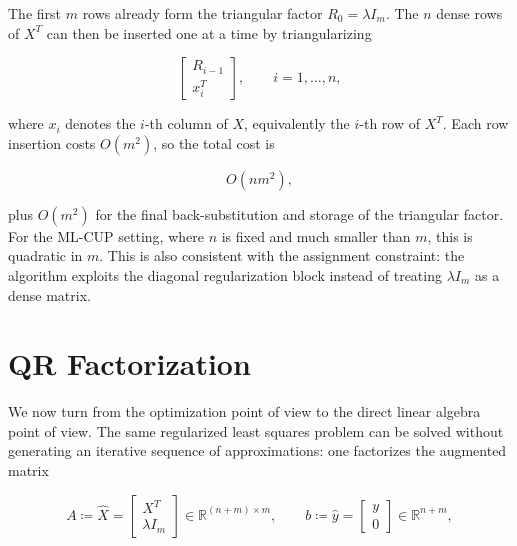 \documentclass[11pt,a4paper]{article}
\newcommand{\R}{\mathbb{R}}
\newcommand{\Xhat}{\hat{X}}
\newcommand{\yhat}{\hat{y}}
\begin{document}
The first $m$ rows already form the triangular factor $R_0=\lambda I_m$. The $n$ dense 
rows of $X^T$ can then be inserted one at a time by triangularizing

\begin{equation}
    \begin{bmatrix}
        R_{i-1} \\ x_i^T
    \end{bmatrix},
    \qquad i=1,\ldots,n,
\end{equation}

where $x_i$ denotes the $i$-th column of $X$, equivalently the $i$-th row of $X^T$. 
Each row insertion costs $O(m^2)$, so the total cost is

\begin{equation}
\label{eq:structured_qr_cost}
    O(nm^2),
\end{equation}

plus $O(m^2)$ for the final back-substitution and storage of the triangular factor. 
For the ML-CUP setting, where $n$ is fixed and much smaller than $m$, this is quadratic 
in $m$. This is also consistent with the assignment constraint: the algorithm exploits 
the diagonal regularization block instead of treating $\lambda I_m$ as a dense matrix.


\section{QR Factorization}
\label{sec:qr}

We now turn from the optimization point of view to the direct linear algebra point 
of view. The same regularized least squares problem can be solved without generating 
an iterative sequence of approximations: one factorizes the augmented matrix

\begin{equation}
    A \coloneqq \Xhat =
    \begin{bmatrix}
        X^T \\ \lambda I_m
    \end{bmatrix}
    \in \R^{(n+m)\times m},
    \qquad
    b \coloneqq \yhat =
    \begin{bmatrix}
        y \\ 0
    \end{bmatrix}
    \in \R^{n+m},
\end{equation}
\end{document}
